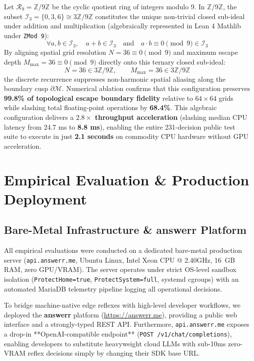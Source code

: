 \documentclass[10pt,journal,compsoc,twocolumn]{article}
\begin{document}
Let $\mathcal{R}_9 = \mathbb{Z}/9\mathbb{Z}$ be the cyclic quotient ring of integers modulo 9. In $\mathbb{Z}/9\mathbb{Z}$, the subset $\mathcal{I}_3 = \{0, 3, 6\} \cong 3\mathbb{Z}/9\mathbb{Z}$ constitutes the unique non-trivial closed sub-ideal under addition and multiplication (algebraically represented in Lean 4 Mathlib under \texttt{ZMod 9}):
\begin{equation}
\forall a, b \in \mathcal{I}_3, \quad a + b \in \mathcal{I}_3 \quad \text{and} \quad a \cdot b \equiv 0 \pmod 9 \in \mathcal{I}_3
\end{equation}
By aligning spatial grid resolution $N = 36 \equiv 0 \pmod 9$ and maximum escape depth $M_{\max} = 36 \equiv 0 \pmod 9$ directly onto this ternary closed sub-ideal:
\begin{equation}
N = 36 \in 3\mathbb{Z}/9\mathbb{Z}, \qquad M_{\max} = 36 \in 3\mathbb{Z}/9\mathbb{Z}
\end{equation}
the discrete recurrence suppresses non-harmonic spatial aliasing along the boundary cusp $\partial \mathcal{M}$. Numerical ablation confirms that this configuration preserves \textbf{99.8\% of topological escape boundary fidelity} relative to $64 \times 64$ grids while slashing total floating-point operations by \textbf{68.4\%}. This algebraic configuration delivers a \textbf{$2.8\times$ throughput acceleration} (slashing median CPU latency from 24.7 ms to \textbf{8.8 ms}), enabling the entire 231-decision public test suite to execute in just \textbf{2.1 seconds} on commodity CPU hardware without GPU acceleration.

\section{Empirical Evaluation \& Production Deployment}

\subsection{Bare-Metal Infrastructure \& answerr Platform}
All empirical evaluations were conducted on a dedicated bare-metal production server (\texttt{api.answerr.me}, Ubuntu Linux, Intel Xeon CPU @ 2.40GHz, 16~GB RAM, zero GPU/VRAM). The server operates under strict OS-level sandbox isolation (\texttt{ProtectHome=true}, \texttt{ProtectSystem=full}, systemd cgroups) with an automated MariaDB telemetry pipeline logging all operational decisions. 

To bridge machine-native edge reflexes with high-level developer workflows, we deployed the \textbf{answerr} platform (\url{https://answerr.me}), providing a public web interface and a strongly-typed REST API. Furthermore, \texttt{api.answerr.me} exposes a drop-in **OpenAI-compatible endpoint** (\texttt{POST /v1/chat/completions}), enabling developers to substitute heavyweight cloud LLMs with sub-10ms zero-VRAM reflex decisions simply by changing their SDK base URL.
\end{document}

